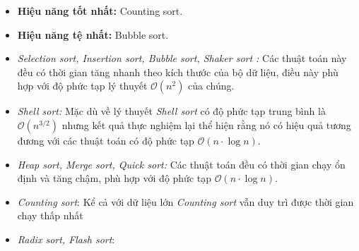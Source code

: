     \begin{itemize}
        \item \textbf{Hiệu năng tốt nhất:} Counting sort.
        \item \textbf{Hiệu năng tệ nhất:} Bubble sort.
        \item \textit{Selection sort, Insertion sort, Bubble sort, Shaker sort :} Các thuật toán này đều có thời gian tăng nhanh theo kích thước của bộ dữ liệu, điều này phù hợp với độ phức tạp lý thuyết $\mathcal{O}(n^2)$ của chúng.
        \item \textit{Shell sort:} Mặc dù về lý thuyết \textit{Shell sort} có độ phức tạp trung bình là $\mathcal{O}(n^{3/2})$ nhưng kết quả thực nghiệm lại thể hiện rằng nó có hiệu quả tương đương với các thuật toán có độ phức tạp $\mathcal{O}(n \cdot \log n)$. 
        \item \textit{Heap sort, Merge sort, Quick sort:} Các thuật toán đều có thời gian chạy ổn định và tăng chậm, phù hợp với độ phức tạp $\mathcal{O}(n \cdot \log n)$.
        \item \textit{Counting sort}: Kể cả với dữ liệu lớn \textit{Counting sort} vẫn duy trì được thời gian chạy thấp nhất
        \item \textit{Radix sort, Flash sort}:  
    \end{itemize}
\newpage
